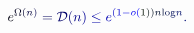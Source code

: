 \documentclass[12pt]{article}
\begin{document}
\makeatletter
\renewcommand*{\@textcolor}[3]{%
  \protect\leavevmode
  \begingroup
    \color#1{#2}#3%
  \endgroup
}
\makeatother
\begin{displaymath}
\mathcolor[RGB]{0,0,15}{e} ^ { \mathcolor[RGB]{0,0,30}{\Omega} \mathcolor[RGB]{0,0,45}{(} \mathcolor[RGB]{0,0,60}{n} \mathcolor[RGB]{0,0,75}{)} } \mathcolor[RGB]{0,0,90}{=} \mathcal { \mathcolor[RGB]{0,0,105}{D} } \mathcolor[RGB]{0,0,120}{(} \mathcolor[RGB]{0,0,135}{n} \mathcolor[RGB]{0,0,150}{)} \mathcolor[RGB]{0,0,165}{\leq} \mathcolor[RGB]{0,0,180}{e} ^ { \mathcolor[RGB]{0,0,195}{(} \mathcolor[RGB]{0,0,210}{1} \mathcolor[RGB]{0,0,225}{-} \mathcolor[RGB]{0,0,240}{o} \mathcolor[RGB]{0,0,255}{(} \mathcolor[RGB]{0,15,0}{1} \mathcolor[RGB]{0,15,15}{)} \mathcolor[RGB]{0,15,30}{)} \mathcolor[RGB]{0,15,45}{n} \mathrm { \mathcolor[RGB]{0,15,60}{l} \mathcolor[RGB]{0,15,75}{o} \mathcolor[RGB]{0,15,90}{g} } \mathcolor[RGB]{0,15,105}{n} } \mathcolor[RGB]{0,15,120}{.}
\end{displaymath}
\end{document}
